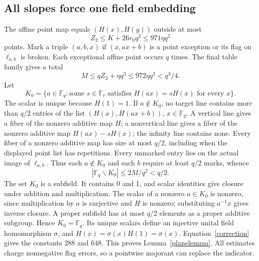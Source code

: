 \documentclass[11pt]{article}
\newcommand{\F}{\mathbb F}
\begin{document}
\subsection{All slopes force one field embedding}
The affine point map equals $(H(x),H(y))$ outside at most
\[
 Z_2\leq K+26r_0q^2\leq971\eta q^2
\]
points. Mark a triple $(a,b,x)$ if $(x,ax+b)$ is a point exception or
its flag on $\ell_{a,b}$ is broken. Each exceptional affine point occurs
$q$ times. The final table family gives a total
\begin{equation}\label{marks}
 M\leq qZ_2+\eta q^3\leq972\eta q^3<q^3/4.
\end{equation}
Let
\[
 K_0=\{a\in\F_q:\text{some }s\in\F_r\text{ satisfies }
                   H(ax)=sH(x)\text{ for every }x\}.
\]
The scalar is unique because $H(1)=1$. If $a\notin K_0$, no target
line contains more than $q/2$ entries of the list
$(H(x),H(ax+b))$, $x\in\F_q$. A vertical line gives a fiber of the
nonzero additive map $H$; a nonvertical line gives a fiber of the
nonzero additive map $H(ax)-sH(x)$; the infinity line contains none.
Every fiber of a nonzero additive map has size at most $q/2$, including
when the displayed point list has repetitions. Every unmarked entry
lies on the actual image of $\ell_{a,b}$. Thus each $a\notin K_0$
and each $b$ require at least $q/2$ marks, whence
\[
 |\F_q\smallsetminus K_0|\leq2M/q^2<q/2.
\]
The set $K_0$ is a subfield. It contains 0 and 1, and scalar identities
give closure under addition and multiplication. The scalar of a nonzero
$a\in K_0$ is nonzero, since multiplication by $a$ is surjective and
$H$ is nonzero; substituting $a^{-1}x$ gives inverse closure. A proper
subfield has at most $q/2$ elements as a proper additive subgroup.
Hence $K_0=\F_q$. Its unique scalars define an injective unital field
homomorphism $\sigma$, and $H(x)=\sigma(x)H(1)=\sigma(x)$.
Equation~\eqref{correction} gives the constants $288$ and $648$.
This proves Lemma~\ref{planelemma}. All estimates charge nonnegative
flag errors, so a pointwise majorant can replace the indicator.
\end{document}

